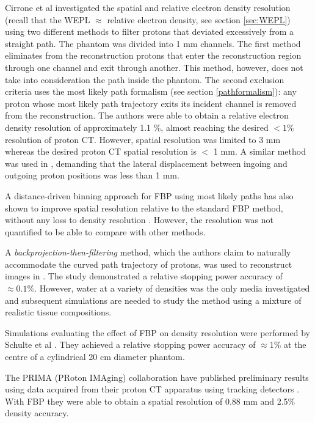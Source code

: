 \documentclass[11pt,a4paper]{article}
\begin{document}
Cirrone et al \cite{cirrone2011monte} investigated the spatial and relative electron density resolution (recall that the WEPL $\approx$ relative electron density, see section \ref{sec:WEPL}) using two different methods to filter protons that deviated excessively from a straight path. The phantom was divided into 1 mm channels. The first method eliminates from the reconstruction protons that enter the reconstruction region through one channel and exit through another. This method, however, does not take into consideration the path inside the phantom. The second exclusion criteria uses the most likely path formalism (see section \ref{pathformalism}): any proton whose most likely path trajectory exits its incident channel is removed from the reconstruction. The authors were able to obtain a relative electron density resolution of approximately 1.1 \%, almost reaching the desired $< 1\%$ resolution of proton CT. However, spatial resolution was limited to 3 mm whereas the desired proton CT spatial resolution is $<$ 1 mm. A similar method was used in \cite{aso2007study}, demanding that the lateral displacement between ingoing and outgoing proton positions was less than 1 mm.

A distance-driven binning approach for FBP using most likely paths has also shown to improve spatial resolution relative to the standard FBP method, without any loss to density resolution \cite{rit2012distance}. However, the resolution was not quantified to be able to compare with other methods.

A \textit{backprojection-then-filtering} method, which the authors claim to naturally accommodate the curved path trajectory of protons, was used to reconstruct images in \cite{poludniowski2014proton}. The study demonstrated a relative stopping power accuracy of $\approx 0.1\%$. However, water at a variety of densities was the only media investigated and subsequent simulations are needed to study the method using a mixture of realistic tissue compositions.

Simulations evaluating the effect of FBP on density resolution were performed by Schulte et al \cite{schulte2005density}. They achieved a relative stopping power accuracy of $\approx 1\%$ at the centre of a cylindrical 20 cm diameter phantom.

The PRIMA (PRoton IMAging) collaboration have published preliminary results using data acquired from their proton CT apparatus using tracking detectors \cite{vanzi2013prima}. With FBP they were able to obtain a spatial resolution of 0.88 mm and 2.5\% density accuracy.
\end{document}
